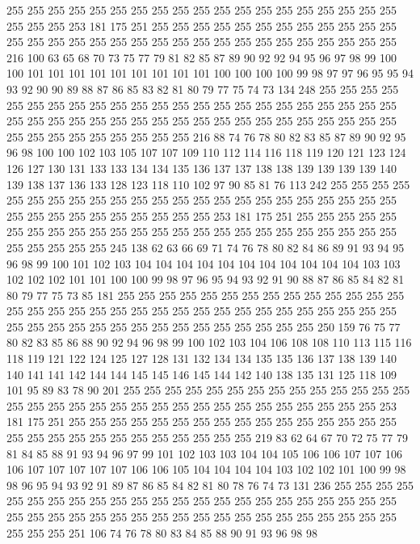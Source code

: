255 255 255 255 255 255 255 255 255 255 255 255 255 255 255 255 255 255 255 255
255 255 253 181 175 251 255 255 255 255 255 255 255 255 255 255 255 255 255 255
255 255 255 255 255 255 255 255 255 255 255 255 255 255 255 255 255 216 100 63
65 68 70 73 75 77 79 81 82 85 87 89 90 92 92 94 95 96 97 98
99 100 100 101 101 101 101 101 101 101 101 101 100 100 100 100 99 98 97 97
96 95 95 94 93 92 90 90 89 88 87 86 85 83 82 81 80 79 77 75
74 73 134 248 255 255 255 255 255 255 255 255 255 255 255 255 255 255 255 255
255 255 255 255 255 255 255 255 255 255 255 255 255 255 255 255 255 255 255 255
255 255 255 255 255 255 255 255 255 255 255 255 255 255 255 216 88 74 76 78
80 82 83 85 87 89 90 92 95 96 98 100 100 102 103 105 107 107 109 110
112 114 116 118 119 120 121 123 124 126 127 130 131 133 133 134 134 135 136 137
137 138 138 139 139 139 139 140 139 138 137 136 133 128 123 118 110 102 97 90
85 81 76 113 242 255 255 255 255 255 255 255 255 255 255 255 255 255 255 255
255 255 255 255 255 255 255 255 255 255 255 255 255 255 255 255 255 255 253 181
175 251 255 255 255 255 255 255 255 255 255 255 255 255 255 255 255 255 255 255
255 255 255 255 255 255 255 255 255 255 255 245 138 62 63 66 69 71 74 76
78 80 82 84 86 89 91 93 94 95 96 98 99 100 101 102 103 104 104 104
104 104 104 104 104 104 104 104 103 103 102 102 102 101 101 100 100 99 98 97
96 95 94 93 92 91 90 88 87 86 85 84 82 81 80 79 77 75 73 85
181 255 255 255 255 255 255 255 255 255 255 255 255 255 255 255 255 255 255 255
255 255 255 255 255 255 255 255 255 255 255 255 255 255 255 255 255 255 255 255
255 255 255 255 255 255 255 255 255 250 159 76 75 77 80 82 83 85 86 88
90 92 94 96 98 99 100 102 103 104 106 108 108 110 113 115 116 118 119 121
122 124 125 127 128 131 132 134 134 135 135 136 137 138 139 140 140 141 141 142
144 144 145 145 146 145 144 142 140 138 135 131 125 118 109 101 95 89 83 78
90 201 255 255 255 255 255 255 255 255 255 255 255 255 255 255 255 255 255 255
255 255 255 255 255 255 255 255 255 255 255 255 255 255 253 181 175 251 255 255
255 255 255 255 255 255 255 255 255 255 255 255 255 255 255 255 255 255 255 255
255 255 255 255 255 255 219 83 62 64 67 70 72 75 77 79 81 84 85 88
91 93 94 96 97 99 101 102 103 103 104 104 105 106 106 107 107 106 106 107
107 107 107 107 106 106 105 104 104 104 104 103 102 102 101 100 99 98 98 96
95 94 93 92 91 89 87 86 85 84 82 81 80 78 76 74 73 131 236 255
255 255 255 255 255 255 255 255 255 255 255 255 255 255 255 255 255 255 255 255
255 255 255 255 255 255 255 255 255 255 255 255 255 255 255 255 255 255 255 255
255 255 255 255 251 106 74 76 78 80 83 84 85 88 90 91 93 96 98 98
